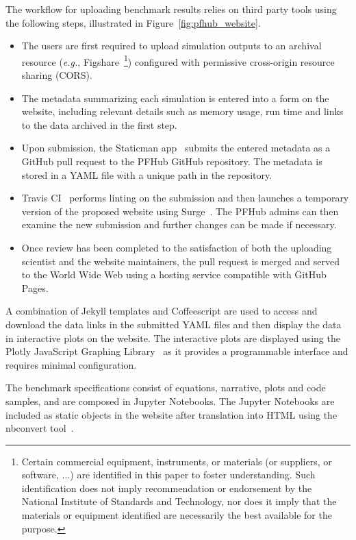 \documentclass{jors}
\begin{document}
The workflow for uploading benchmark results relies on third party
tools using the following steps, illustrated in
Figure~\ref{fig:pfhub_website}.

\begin{itemize}
  \item The users are first required to upload simulation outputs to
    an archival resource (\emph{e.g.}, Figshare~\footnote{Certain
      commercial equipment, instruments, or materials (or suppliers,
      or software, ...) are identified in this paper to foster
      understanding. Such identification does not imply recommendation
      or endorsement by the National Institute of Standards and
      Technology, nor does it imply that the materials or equipment
      identified are necessarily the best available for the
      purpose.\label{disclaimer}}) configured with permissive
    cross-origin resource sharing (CORS).
  \item The metadata summarizing each simulation is entered into a
    form on the website, including relevant details such as memory
    usage, run time and links to the data archived in the first step.
  \item Upon submission, the Staticman app~\cite{staticman} submits
    the entered metadata as a GitHub pull request to the PFHub GitHub
    repository.  The metadata is stored in a YAML file with a unique
    path in the repository.
  \item Travis CI~\cite{travis} performs linting on the submission and
    then launches a temporary version of the proposed website using
    Surge~\cite{surge}. The PFHub admins can then examine the new
    submission and further changes can be made if necessary.
  \item Once review has been completed to the satisfaction of both the
    uploading scientist and the website maintainers, the pull request
    is merged and served to the World Wide Web using a hosting service
    compatible with GitHub Pages.
\end{itemize}

A combination of Jekyll templates and Coffeescript are used to access
and download the data links in the submitted YAML files and then
display the data in interactive plots on the website. The interactive
plots are displayed using the Plotly JavaScript Graphing
Library~\cite{plotly} as it provides a programmable interface and
requires minimal configuration.

The benchmark specifications consist of equations, narrative, plots
and code samples, and are composed in Jupyter Notebooks. The Jupyter
Notebooks are included as static objects in the website after
translation into HTML using the nbconvert tool~\cite{jupyter}.
\end{document}
